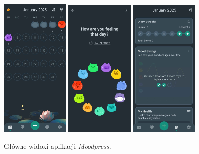 \documentclass[inz, shortabstract]{iithesis}
\begin{document}
\begin{figure}[!ht]
\centering
\includegraphics[width=0.3\textwidth]{moodpress1.jpg} 
\includegraphics[width=0.3\textwidth]{moodpress2.jpg} 
\includegraphics[width=0.3\textwidth]{moodpress3.jpg} 
\caption{Główne widoki aplikacji \textit{Moodpress}.}
\end{figure}
\end{document}
